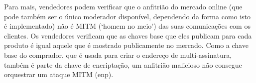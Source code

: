 Para mais, vendedores podem verificar que o anfitrião do mercado online (que pode também ser o único moderador disponível, dependendo da forma como isto é implementado) não é MITM (`homem no meio') das suas comunicações com os clientes. Os vendedores verificam que as chaves base que eles publicam para cada produto é igual aquele que é mostrado publicamente no mercado. Como a chave base do comprador, que é usada para criar o endereço de multi-assinatura, também é parte da chave de encriptação, um anfitrião malicioso não consegue orquestrar um ataque MITM (enp).

